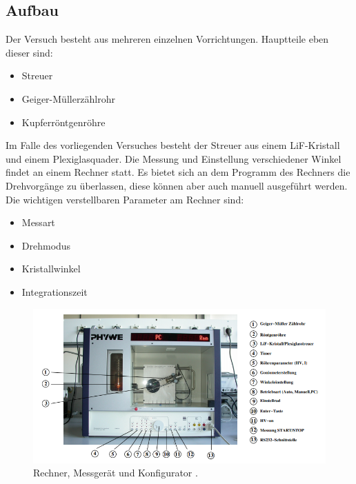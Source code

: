 \subsection{Aufbau}
Der Versuch besteht aus mehreren einzelnen Vorrichtungen. Hauptteile eben dieser sind:
\begin{itemize}
\item{Streuer}
\item{Geiger-Müllerzählrohr}
\item{Kupferröntgenröhre}
\end{itemize}
Im Falle des vorliegenden Versuches besteht der Streuer aus einem LiF-Kristall und einem Plexiglasquader. 
Die Messung und Einstellung verschiedener Winkel findet an einem Rechner statt. Es bietet sich an dem Programm des Rechners 
die Drehvorgänge zu überlassen, diese können aber auch manuell ausgeführt werden. 
Die wichtigen verstellbaren Parameter am Rechner sind:
\begin{itemize}
\item{Messart}
\item{Drehmodus}
\item{Kristallwinkel}
\item{Integrationszeit}
\end{itemize}
 
\begin{figure}
    \centering
    \includegraphics[width=\textwidth]{bilder/Screenshot 2021-01-29 104244.png}
    \caption{Rechner, Messgerät und Konfigurator \cite{skript}. } 
    \label{fig:Rechner}
\end{figure}

